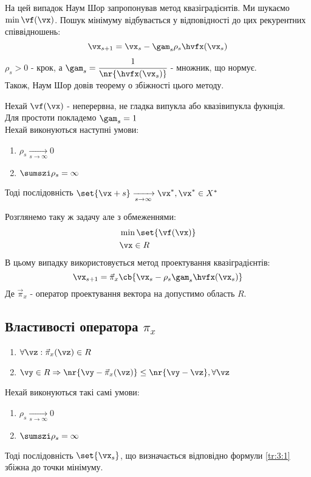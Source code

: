 На цей випадок Наум Шор запропонував метод квазіградієнтів. Ми шукаємо $\min \vf(\vx)$. Пошук мінімуму відбувається у відповідності до цих рекурентних співвідношень:
\begin{equation}
\vx_{s+1} = \vx_s - \gam_s\rho_s \hvfx(\vx_s)
\end{equation}
$\rho_s>0$ - крок, а $\gam_s = \cfrac1{\nr{\hvfx(\vx_s)}}$ - множник, що нормує.\\
Також, Наум Шор довів теорему о збіжності цього методу.\\
\begin{teor}
Нехай $\vf(\vx)$ - неперервна, не гладка випукла або квазівипукла фукнція.\\
Для простоти покладемо  $\gam_s=1$\\
Нехай виконуються наступні умови:
\begin{enumerate}
\item $\rho_s\xrightarrow[s\to\infty]{}0$
\item $\sumszi \rho_s = \infty$
\end{enumerate}
Тоді послідовність $\set{\vx+s}\xrightarrow[s\to\infty]{} \vx^\ast,\vx^\ast\in X^\ast$
\end{teor}
Розглянемо таку ж задачу але з обмеженнями:
\begin{eqnarray}
&\min\set{\vf(\vx)}\\
&\vx\in R
\end{eqnarray}
В цьому випадку використовується метод проектування квазіградієнтів:
\begin{equation}\label{tr:3:1}
\vx_{s+1} = \vec {\pi}_x\cb{\vx_s - \rho_s\gam_s \hvfx(\vx_s)}
\end{equation}
Де $\vec{\pi}_x$ - оператор проектування вектора на допустимо область $R$.
\subsection{Властивості оператора $\pi_x$}
\begin{enumerate}
\item $\forall \vz: \vec{\pi}_x(\vz)\in R$
\item $\vy\in R \Rightarrow \nr{\vy-\vec{\pi}_x(\vz)}\leq\nr{\vy-\vz},\forall \vz$
\end{enumerate}
\begin{teor}
Нехай виконуються такі самі умови:
\begin{enumerate}
\item $\rho_s\xrightarrow[s\to\infty]{}0$
\item $\sumszi \rho_s = \infty$
\end{enumerate}
Тоді послідовність $\set{\vx_s}$, що визначається відповідно формули \eqref{tr:3:1} збіжна до точки мінімуму.
\end{teor}
